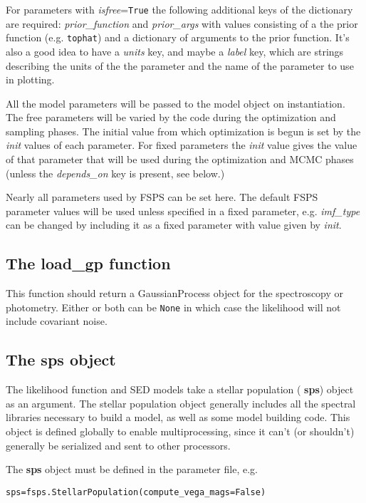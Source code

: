 \documentclass[12pt, letterpaper, preprint]{aastex}
\begin{document}
For parameters with {\it isfree}=\texttt{True} the following
additional keys of the dictionary are required: {\it prior\_function}
and {\it prior\_args} with values consisting of a the prior function
(e.g. \texttt{tophat}) and a dictionary of arguments to the prior
function. It's also a good idea to have a {\it units} key, and maybe a
{\it label} key, which are strings describing the units of the the
parameter and the name of the parameter to use in plotting.

All the model parameters will be passed to the model object on
instantiation.  The free parameters will be varied by the code during
the optimization and sampling phases.  The initial value from which
optimization is begun is set by the {\it init} values of each
parameter.  For fixed parameters the {\it init} value gives the value
of that parameter that will be used during the optimization and MCMC
phases (unless the {\it depends\_on} key is present, see below.)

Nearly all parameters used by FSPS can be set here.  The default FSPS
parameter values will be used unless specified in a fixed parameter,
e.g. {\it imf\_type} can be changed by including it as a fixed
parameter with value given by {\it init}.

\subsection{The {\bf load_gp} function}
This function should return a GaussianProcess object for the
spectroscopy or photometry.  Either or both can be \texttt{None} in
which case the likelihood will not include covariant noise.

\subsection{The {\bf sps} object}
The likelihood function and SED models take a stellar population ({\bf
sps}) object as an argument.  The stellar population object generally
includes all the spectral libraries necessary to build a model, as
well as some model building code. This object is defined globally to
enable multiprocessing, since it can't (or shouldn't) generally be
serialized and sent to other processors.

The {\bf sps} object must be defined in the parameter file, e.g. 

\begin{center}
\texttt{sps=fsps.StellarPopulation(compute\_vega\_mags=False)}
\end{center}
\end{document}
